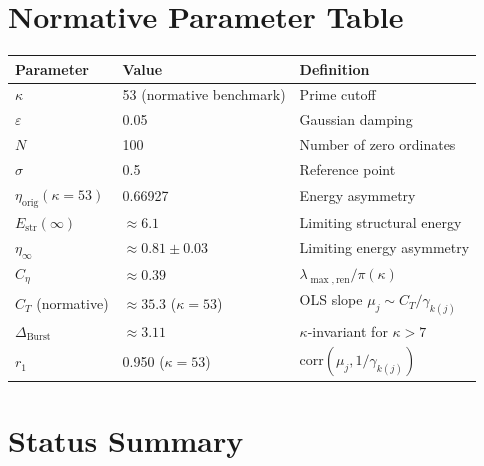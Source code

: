 \documentclass[11pt]{article}
\newcommand{\Estr}{E_{\mathrm{str}}}
\newcommand{\etaorig}{\eta_{\mathrm{orig}}}
\newcommand{\Ceta}{C_{\eta}}
\newcommand{\CT}{C_{T}}
\newcommand{\Dburstvar}{\Delta_{\mathrm{Burst}}}
\begin{document}
\section{Normative Parameter Table}

\begin{center}
\renewcommand{\arraystretch}{1.3}
\begin{tabular}{lll}
\toprule
Parameter & Value & Definition \\
\midrule
$\kappa$ & 53 (normative benchmark) & Prime cutoff \\
$\varepsilon$ & 0.05 & Gaussian damping \\
$N$ & 100 & Number of zero ordinates \\
$\sigma$ & 0.5 & Reference point \\
$\etaorig(\kappa=53)$ & 0.66927 & Energy asymmetry \\
$\Estr(\infty)$ & $\approx 6.1$ & Limiting structural energy \\
$\eta_\infty$ & $\approx 0.81\pm 0.03$ & Limiting energy asymmetry \\
$\Ceta$ & $\approx 0.39$ & $\lambda_{\max,\mathrm{ren}}/\pi(\kappa)$ \\
$\CT$ (normative) & $\approx 35.3$ ($\kappa=53$)
  & OLS slope $\mu_j\sim\CT/\gamma_{k(j)}$ \\
$\Dburstvar$ & $\approx 3.11$ & $\kappa$-invariant for $\kappa > 7$ \\
$r_1$ & 0.950 ($\kappa=53$)
  & $\mathrm{corr}(\mu_j, 1/\gamma_{k(j)})$ \\
\bottomrule
\end{tabular}
\end{center}

\section{Status Summary}
\end{document}

